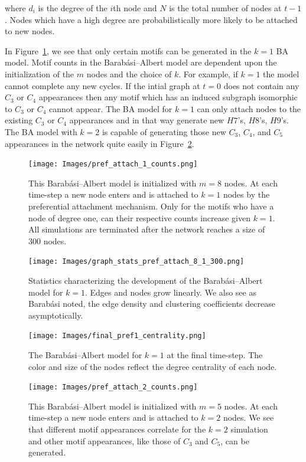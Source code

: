 \noindent where $d_i$ is the degree of the $i$th node and $N$ is the total number of nodes at $t-1$.
 Nodes which have a high degree are probabilistically more likely to be attached to new nodes. 

In Figure~\ref{fig:BA1}, we see that only certain motifs can be generated in the $k=1$ BA model.
Motif counts in the Barabási–Albert model are dependent upon the initialization of the $m$ nodes 
and the choice of $k$. For example, if $k=1$ the model cannot complete any new cycles. If the
intial graph at $t=0$ does not contain any $C_3$ or $C_4$ appearances then any motif 
which has an induced subgraph isomorphic to $C_3$ or $C_4$ cannot appear. The BA model 
for $k=1$ can only attach nodes to the existing  $C_3$ or $C_4$ appearances and in that 
way generate new $H7$'s, $H8$'s, $H9$'s. The BA model with $k=2$ is capable of generating those
 new $C_3$, $C_4$, and $C_5$ appearances in the network quite easily in Figure~\ref{fig:BA2}.

\begin{figure}[h!]
    \texttt{[image: Images/pref\_attach\_1\_counts.png]}
    \centering
    \caption{This Barabási–Albert model is initialized with $m=8$ nodes.
    At each time-step a new node enters and is attached to $k=1$ nodes by the preferential attachment mechanism.
     Only for the motifs who have a node
    of degree one, can their respective counts increase given $k=1$. All simulations are terminated after the 
    network reaches a size of $300$ nodes.}
    \label{fig:BA1}
\end{figure}


\begin{figure}[h!]
    \texttt{[image: Images/graph\_stats\_pref\_attach\_8\_1\_300.png]}
    \centering
    \caption{Statistics characterizing the development of the Barabási–Albert model for $k=1$.
    Edges and nodes grow linearly. We also see as Barabási noted, the edge density and clustering coefficients decrease asymptotically.}
\end{figure}


\begin{figure}
    \texttt{[image: Images/final\_pref1\_centrality.png]}
    \centering
    \caption{The Barabási–Albert model for $k=1$ at the final time-step. The color and size of the nodes reflect
            the degree centrality of each node.}
\end{figure}

\begin{figure}[h!]
    \texttt{[image: Images/pref\_attach\_2\_counts.png]}
    \centering
    \caption{This Barabási–Albert model is initialized with $m=5$ nodes.
    At each time-step a new node enters and is attached to $k=2$ nodes. We see that different motif appearances
    correlate for the $k=2$ simulation and other motif appearances, like those of $C_3$ and $C_5$, can be generated.}
    \label{fig:BA2}
\end{figure}

